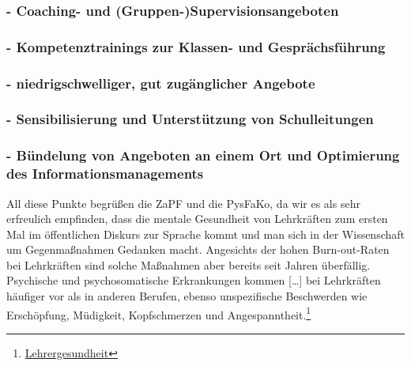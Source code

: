 \documentclass[DIV=calc]{scrartcl}
\let\oldgrqq=\grqq
\def\grqq{\oldgrqq\xspace}
\begin{document}
\subsubsection*{- Coaching- und (Gruppen-)Supervisionsangeboten}
\subsubsection*{- Kompetenztrainings zur Klassen- und Gesprächsführung}
\subsubsection*{- niedrigschwelliger, gut zugänglicher Angebote}
\subsubsection*{- Sensibilisierung und Unterstützung von Schulleitungen}
\subsubsection*{- Bündelung von Angeboten an einem Ort und Optimierung des Informationsmanagements}


All diese Punkte begrüßen die ZaPF und die PysFaKo, da wir es als sehr erfreulich empfinden, dass die mentale Gesundheit von Lehrkräften zum ersten Mal im öffentlichen Diskurs zur Sprache kommt und man sich in der Wissenschaft um Gegenmaßnahmen Gedanken macht.
Angesichts der hohen Burn-out-Raten bei Lehrkräften sind solche Maßnahmen aber bereits seit Jahren überfällig. \glqq Psychische und psychosomatische Erkrankungen kommen [\dots] bei Lehrkräften häufiger vor als in anderen Berufen, ebenso unspezifische Beschwerden wie Erschöpfung, Müdigkeit, Kopfschmerzen und Angespanntheit.\grqq \footnote{\href{https://www.aerzteblatt.de/archiv/170601/Lehrergesundheit}{Lehrergesundheit}}
\end{document}
